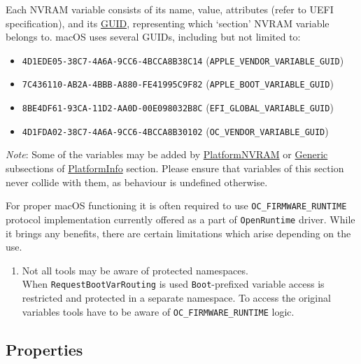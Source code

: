 \documentclass[]{article}
\providecommand{\tightlist}{%
  \setlength{\itemsep}{0pt}\setlength{\parskip}{0pt}}
\begin{document}
Each NVRAM variable consists of its name, value, attributes (refer to
UEFI specification), and its
\href{https://en.wikipedia.org/wiki/Universally_unique_identifier}{GUID},
representing which `section' NVRAM variable belongs to. macOS uses
several GUIDs, including but not limited to:

\begin{itemize}
\tightlist
\item
  \texttt{4D1EDE05-38C7-4A6A-9CC6-4BCCA8B38C14}
  (\texttt{APPLE\_VENDOR\_VARIABLE\_GUID})
\item
  \texttt{7C436110-AB2A-4BBB-A880-FE41995C9F82}
  (\texttt{APPLE\_BOOT\_VARIABLE\_GUID})
\item
  \texttt{8BE4DF61-93CA-11D2-AA0D-00E098032B8C}
  (\texttt{EFI\_GLOBAL\_VARIABLE\_GUID})
\item
  \texttt{4D1FDA02-38C7-4A6A-9CC6-4BCCA8B30102}
  (\texttt{OC\_VENDOR\_VARIABLE\_GUID})
\end{itemize}

\emph{Note}: Some of the variables may be added by
\hyperref[platforminfonvram]{PlatformNVRAM} or
\hyperref[platforminfogeneric]{Generic} subsections of
\hyperref[platforminfo]{PlatformInfo} section.
Please ensure that variables of this section never collide with them,
as behaviour is undefined otherwise.

For proper macOS functioning it is often required to use \texttt{OC\_FIRMWARE\_RUNTIME}
protocol implementation currently offered as a part of \texttt{OpenRuntime} driver.
While it brings any benefits, there are certain limitations which arise depending on the
use.

\begin{enumerate}
\item Not all tools may be aware of protected namespaces.\\
  When \texttt{RequestBootVarRouting} is used \texttt{Boot}-prefixed variable access
  is restricted and protected in a separate namespace. To access the original variables
  tools have to be aware of \texttt{OC\_FIRMWARE\_RUNTIME} logic.
\end{enumerate}

\subsection{Properties}\label{nvramprops}
\end{document}
